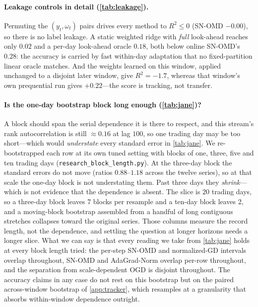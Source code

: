 \documentclass{article}
\begin{document}
\paragraph{Leakage controls in detail (\cref{tab:leakage}).} Permuting the $(y_t,\omega_t)$
pairs drives every method to $R^2\le0$ (SN-OMD $-0.00$), so there is no label leakage. A static
weighted ridge with \emph{full} look-ahead reaches only $0.02$ and a per-day look-ahead oracle
$0.18$, both below online SN-OMD's $0.28$: the accuracy is carried by fast within-day adaptation
that no fixed-partition linear oracle matches. And the weights learned on this window, applied
unchanged to a disjoint later window, give $R^2=-1.7$, whereas that window's own prequential run
gives $+0.22$---the score is tracking, not transfer.

\paragraph{Is the one-day bootstrap block long enough (\cref{tab:jane})?} A block should
span the serial dependence it is there to respect, and this stream's rank autocorrelation is
still ${\approx}0.16$ at lag $100$, so one trading day may be too short---which would \emph{understate}
every standard error in \cref{tab:jane}. We re-bootstrapped each row at its own tuned setting
with blocks of one, three, five and ten trading days
(\texttt{research\_block\_length.py}). At the three-day block the standard errors do not move
(ratios $0.88$--$1.18$ across the twelve series), so at that scale the one-day block is not
understating them. Past three days they \emph{shrink}---which is not evidence that the
dependence is absent. The slice is $20$ trading days, so a three-day block leaves 7 blocks per
resample and a ten-day block leaves 2, and a moving-block bootstrap assembled from a handful of
long contiguous stretches collapses toward the original series. Those columns measure the record
length, not the dependence, and settling the question at longer horizons needs a longer slice.
What we can say is that every reading we take from \cref{tab:jane} holds at every block length
tried: the per-step SN-OMD and normalized-GD intervals overlap throughout, SN-OMD and
AdaGrad-Norm overlap per-row throughout, and the separation from scale-dependent OGD is disjoint
throughout. The accuracy claims in any case do not rest on this bootstrap but on the paired
across-window bootstrap of \cref{app:tracker}, which resamples at a granularity that absorbs
within-window dependence outright.
\end{document}
